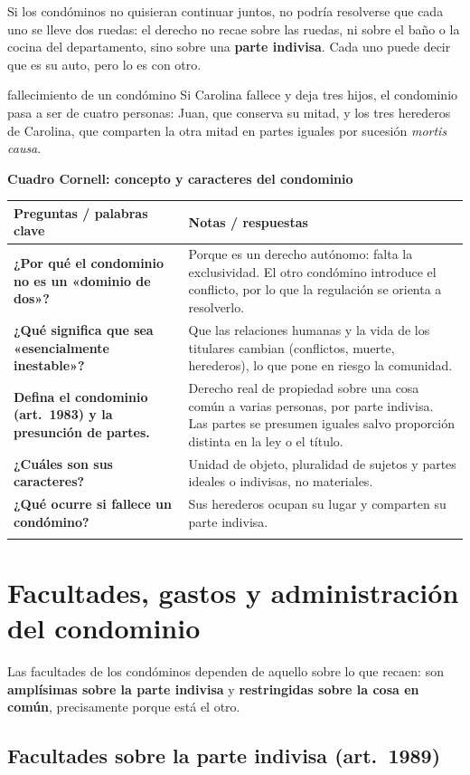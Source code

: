 \documentclass[12pt,oneside]{book}
\renewcommand{\arraystretch}{1.25}
\newcommand{\cq}[2]{\textbf{#1} & #2 \\[0.45em]}
\newcommand{\cornell}[3]{%
\par\bigskip\noindent\textbf{\large Cuadro Cornell: #1}\par\smallskip
\begin{center}
\small
\renewcommand{\arraystretch}{1.15}
\begin{tabularx}{\textwidth}{>{\raggedright\arraybackslash}p{0.27\textwidth}>{\raggedright\arraybackslash}X}
\toprule
\textbf{Preguntas / palabras clave} & \textbf{Notas / respuestas} \\
\midrule
#2
\midrule
\multicolumn{2}{p{\dimexpr\textwidth-2\tabcolsep\relax}}{\textbf{Resumen.} #3} \\
\bottomrule
\end{tabularx}
\end{center}
}
\begin{document}
Si los condóminos no quisieran continuar juntos, no podría resolverse que cada uno se lleve dos ruedas: el derecho no recae sobre las ruedas, ni sobre el baño o la cocina del departamento, sino sobre una \textbf{parte indivisa}. Cada uno puede decir que es su auto, pero lo es con otro.

\begin{ejemplo}{fallecimiento de un condómino}
Si Carolina fallece y deja tres hijos, el condominio pasa a ser de cuatro personas: Juan, que conserva su mitad, y los tres herederos de Carolina, que comparten la otra mitad en partes iguales por sucesión \textit{mortis causa}.
\end{ejemplo}

\cornell{concepto y caracteres del condominio}{
\cq{¿Por qué el condominio no es un «dominio de dos»?}{Porque es un derecho autónomo: falta la exclusividad. El otro condómino introduce el conflicto, por lo que la regulación se orienta a resolverlo.}
\cq{¿Qué significa que sea «esencialmente inestable»?}{Que las relaciones humanas y la vida de los titulares cambian (conflictos, muerte, herederos), lo que pone en riesgo la comunidad.}
\cq{Defina el condominio (art.~1983) y la presunción de partes.}{Derecho real de propiedad sobre una cosa común a varias personas, por parte indivisa. Las partes se presumen iguales salvo proporción distinta en la ley o el título.}
\cq{¿Cuáles son sus caracteres?}{Unidad de objeto, pluralidad de sujetos y partes ideales o indivisas, no materiales.}
\cq{¿Qué ocurre si fallece un condómino?}{Sus herederos ocupan su lugar y comparten su parte indivisa.}
}{El condominio es un derecho real autónomo, de unidad de objeto, pluralidad de sujetos y partes indivisas presumidas iguales, esencialmente inestable por la presencia del otro titular y por la finitud humana.}

\chapter[Facultades, gastos y administración del condominio]{Facultades, gastos y administración del condominio}\label{cap:facultades-cond}

Las facultades de los condóminos dependen de aquello sobre lo que recaen: son \textbf{amplísimas sobre la parte indivisa} y \textbf{restringidas sobre la cosa en común}, precisamente porque está el otro.

\section{Facultades sobre la parte indivisa (art.~1989)}
\end{document}
